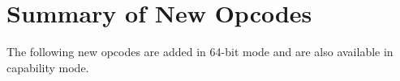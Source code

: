 





























\clearpage
\section{Summary of New Opcodes}

The following new opcodes are added in 64-bit mode and are also
available in capability mode.

